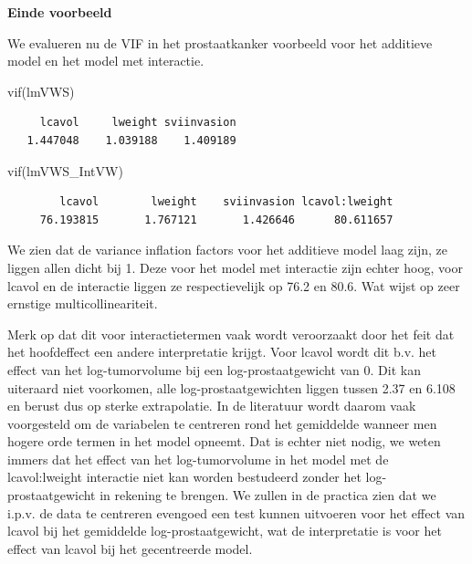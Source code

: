 \documentclass[
  dutch,
  letterpaper,
  12pt]{book}
\newenvironment{Shaded}{\begin{snugshade}}{\end{snugshade}}
\newcommand{\FunctionTok}[1]{\textcolor[rgb]{0.28,0.35,0.67}{#1}}
\newcommand{\NormalTok}[1]{\textcolor[rgb]{0.00,0.23,0.31}{#1}}
\theoremstyle{definition}
\theoremstyle{definition}
\theoremstyle{definition}
\theoremstyle{remark}
\begin{document}
\textbf{Einde voorbeeld}

We evalueren nu de VIF in het prostaatkanker voorbeeld voor het
additieve model en het model met interactie.

\begin{Shaded}
\begin{Highlighting}[]
\FunctionTok{vif}\NormalTok{(lmVWS)}
\end{Highlighting}
\end{Shaded}

\begin{verbatim}
     lcavol     lweight sviinvasion 
   1.447048    1.039188    1.409189 
\end{verbatim}

\begin{Shaded}
\begin{Highlighting}[]
\FunctionTok{vif}\NormalTok{(lmVWS\_IntVW)}
\end{Highlighting}
\end{Shaded}

\begin{verbatim}
        lcavol        lweight    sviinvasion lcavol:lweight 
     76.193815       1.767121       1.426646      80.611657 
\end{verbatim}

We zien dat de variance inflation factors voor het additieve model laag
zijn, ze liggen allen dicht bij 1. Deze voor het model met interactie
zijn echter hoog, voor lcavol en de interactie liggen ze respectievelijk
op 76.2 en 80.6. Wat wijst op zeer ernstige multicollineariteit.

Merk op dat dit voor interactietermen vaak wordt veroorzaakt door het
feit dat het hoofdeffect een andere interpretatie krijgt. Voor lcavol
wordt dit b.v. het effect van het log-tumorvolume bij een
log-prostaatgewicht van 0. Dit kan uiteraard niet voorkomen, alle
log-prostaatgewichten liggen tussen 2.37 en 6.108 en berust dus op
sterke extrapolatie. In de literatuur wordt daarom vaak voorgesteld om
de variabelen te centreren rond het gemiddelde wanneer men hogere orde
termen in het model opneemt. Dat is echter niet nodig, we weten immers
dat het effect van het log-tumorvolume in het model met de
lcavol:lweight interactie niet kan worden bestudeerd zonder het
log-prostaatgewicht in rekening te brengen. We zullen in de practica
zien dat we i.p.v. de data te centreren evengoed een test kunnen
uitvoeren voor het effect van lcavol bij het gemiddelde
log-prostaatgewicht, wat de interpretatie is voor het effect van lcavol
bij het gecentreerde model.
\end{document}
